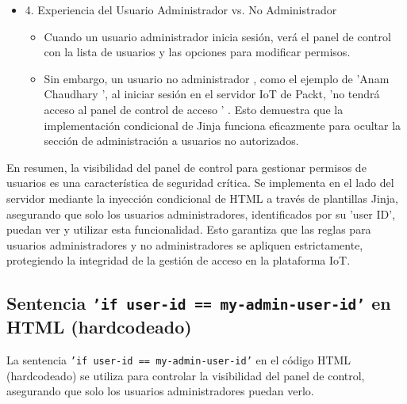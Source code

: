 \documentclass{report}
\begin{document}
\begin{itemize}
    \item 4. Experiencia del Usuario Administrador vs. No Administrador
    \begin{itemize}
        \item Cuando un  usuario administrador  inicia sesión, verá el panel de control con la lista de usuarios y las opciones para modificar permisos.
        \item Sin embargo, un  usuario no administrador , como el ejemplo de  'Anam Chaudhary ', al iniciar sesión en el servidor IoT de Packt, 
        'no tendrá acceso al panel de control de acceso ' . Esto demuestra que la implementación condicional de Jinja funciona eficazmente para 
        ocultar la sección de administración a usuarios no autorizados.    
    \end{itemize}
\end{itemize}

En resumen, la visibilidad del panel de control para gestionar permisos de usuarios es una característica de seguridad crítica. Se implementa en el lado 
del servidor mediante la inyección condicional de HTML a través de plantillas Jinja, asegurando que solo los usuarios administradores, identificados por 
su 'user ID', puedan ver y utilizar esta funcionalidad. Esto garantiza que las reglas para usuarios administradores y no administradores se apliquen 
estrictamente, protegiendo la integridad de la gestión de acceso en la plataforma IoT.

\subsection{Sentencia \texttt{'if user-id == my-admin-user-id'} en HTML (hardcodeado)}

La sentencia \texttt{'if user-id == my-admin-user-id'} en el código HTML (hardcodeado) se utiliza para controlar la visibilidad del panel de control, 
asegurando que solo los usuarios administradores puedan verlo.
\end{document}
